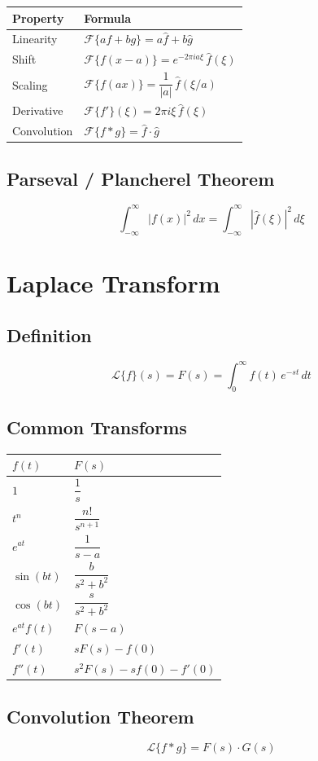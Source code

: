 \documentclass[12pt, a4paper]{article}
\theoremstyle{definition}
\theoremstyle{remark}
\begin{document}
\begin{center}
\begin{tabular}{ll}
\toprule
\textbf{Property} & \textbf{Formula} \\
\midrule
Linearity   & $\mathcal{F}\{af+bg\} = a\hat{f}+b\hat{g}$ \\[6pt]
Shift       & $\mathcal{F}\{f(x-a)\} = e^{-2\pi i a\xi}\,\hat{f}(\xi)$ \\[6pt]
Scaling     & $\mathcal{F}\{f(ax)\} = \dfrac{1}{|a|}\,\hat{f}(\xi/a)$ \\[6pt]
Derivative  & $\mathcal{F}\{f'\}(\xi) = 2\pi i\xi\,\hat{f}(\xi)$ \\[6pt]
Convolution & $\mathcal{F}\{f*g\} = \hat{f}\cdot\hat{g}$ \\
\bottomrule
\end{tabular}
\end{center}

\subsection{Parseval / Plancherel Theorem}
\[
  \int_{-\infty}^\infty |f(x)|^2\,dx = \int_{-\infty}^\infty |\hat{f}(\xi)|^2\,d\xi
\]

\section{Laplace Transform}

\subsection{Definition}
\[
  \mathcal{L}\{f\}(s) = F(s) = \int_0^\infty f(t)\,e^{-st}\,dt
\]

\subsection{Common Transforms}

\begin{center}
\begin{tabular}{ll}
\toprule
$f(t)$ & $F(s)$ \\
\midrule
$1$          & $\dfrac{1}{s}$ \\[8pt]
$t^n$        & $\dfrac{n!}{s^{n+1}}$ \\[8pt]
$e^{at}$     & $\dfrac{1}{s-a}$ \\[8pt]
$\sin(bt)$   & $\dfrac{b}{s^2+b^2}$ \\[8pt]
$\cos(bt)$   & $\dfrac{s}{s^2+b^2}$ \\[8pt]
$e^{at}f(t)$ & $F(s-a)$ \\[8pt]
$f'(t)$      & $sF(s)-f(0)$ \\[8pt]
$f''(t)$     & $s^2F(s)-sf(0)-f'(0)$ \\
\bottomrule
\end{tabular}
\end{center}

\subsection{Convolution Theorem}
\[
  \mathcal{L}\{f * g\} = F(s) \cdot G(s)
\]
\end{document}
